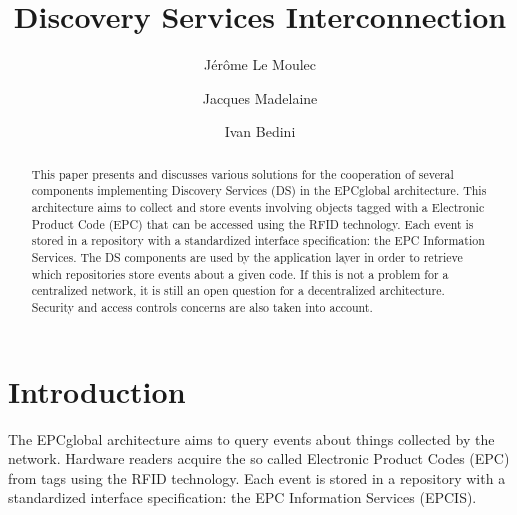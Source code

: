 \documentclass[a4paper]{llncs}
\begin{document}
\pagestyle{empty}

\mainmatter

\title{Discovery Services Interconnection}


\author{J\'{e}r\^{o}me Le Moulec \and Jacques Madelaine \and Ivan Bedini}



\maketitle


\begin{abstract}
  This paper presents and discusses various solutions for the cooperation of several components
implementing Discovery Services (DS) in the EPCglobal architecture. This architecture aims to
collect and store events involving objects tagged with a Electronic Product Code (EPC) that can be
accessed using the RFID technology. Each event is stored in a repository with a standardized
interface specification: the EPC Information Services. The DS components are used by the application
layer in order to retrieve which repositories store events about a given code. If this is not a
problem for a centralized network, it is still an open question for a decentralized architecture.
Security and access controls concerns are also taken into account.
\end{abstract}

\section{Introduction}

The EPCglobal architecture aims to query events about things collected by the network. Hardware
readers acquire the so called Electronic Product Codes (EPC) from tags using the RFID technology.
Each event is stored in a repository with a standardized interface specification: the EPC
Information Services (EPCIS).
\end{document}
